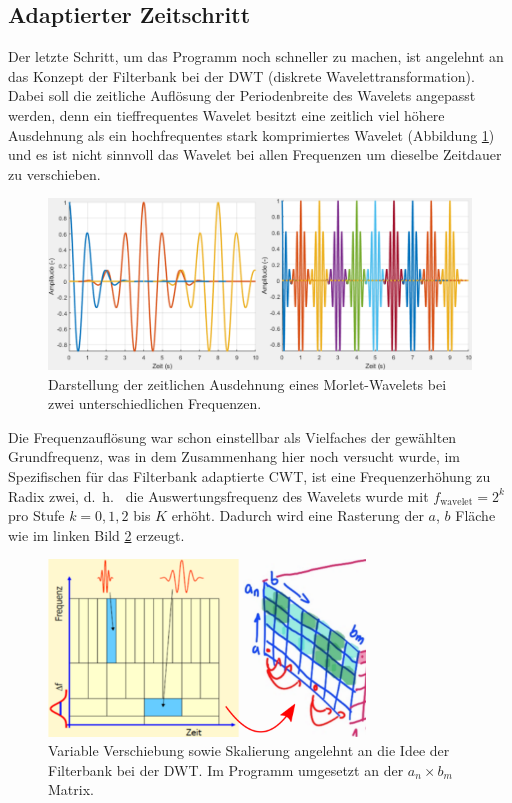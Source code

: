 \subsection{Adaptierter Zeitschritt
	\label{wavelets:subsection:AdaptierterZeitschritt}}
Der letzte Schritt, um das Programm noch schneller zu machen, ist
angelehnt an das Konzept der Filterbank bei der DWT (diskrete
Wavelettransformation).
Dabei soll die zeitliche Auflösung der Periodenbreite des Wavelets
angepasst werden, denn ein tieffrequentes Wavelet besitzt eine
zeitlich viel höhere Ausdehnung als ein hochfrequentes stark
komprimiertes Wavelet (Abbildung \ref{wavelet:fig:adaptedShift_b})
und es ist nicht sinnvoll das Wavelet bei allen Frequenzen um
dieselbe Zeitdauer zu verschieben.

\begin{figure}
	\centering
	\includegraphics[width=\textwidth]{papers/wavelets/images/15-1_adaptedShift-b.png}
	\caption{Darstellung der zeitlichen Ausdehnung eines Morlet-Wavelets
	bei zwei unterschiedlichen Frequenzen.}
	\label{wavelet:fig:adaptedShift_b}
\end{figure}

Die Frequenzauflösung war schon einstellbar als Vielfaches der
gewählten Grundfrequenz, was in dem Zusammenhang hier noch versucht
wurde, im Spezifischen für das Filterbank adaptierte CWT, ist eine
Frequenzerhöhung zu Radix zwei, d.~h.~ die Auswertungsfrequenz des
Wavelets wurde mit $f_\text{wavelet} = 2^k$ pro Stufe $k = 0, 1,
2$ bis $K$ erhöht.
Dadurch wird eine Rasterung der $a$, $b$ Fläche wie im linken Bild
\ref{wavelet:fig:adaptedFrequndTime} erzeugt.

\begin{figure}
	\centering
	\includegraphics[width=0.75\textwidth]{papers/wavelets/images/15-2_adaptedFrequndTime.png}
	\caption{Variable Verschiebung sowie Skalierung angelehnt an die Idee der Filterbank bei der DWT.
Im Programm umgesetzt an der $a_n \times b_m$ Matrix.}
	\label{wavelet:fig:adaptedFrequndTime}
\end{figure}


